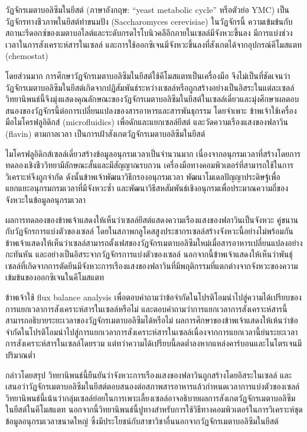 \documentclass{article}
\begin{document}
วัฏจักรเมตาบอลิซึมในยีสต์ (ภาษาอังกฤษ: ``yeast metabolic cycle'' หรือตัวย่อ YMC) เป็นวัฏจักรทางชีวภาพในยีสต์ทำขนมปัง (Saccharomyces cerevisiae) ในวัฏจักรนี้ ความเข้มข้นกับสถานะรีดอกซ์ของเมตาบอไลต์และระดับกรดไรโบนิวคลีอีกภายในเซลล์มีจังหวะขึ้นลง มีการแบ่งช่วงเวลาในการสังเคราะห์สารในเซลล์ และการใช้ออกซิเจนมีจังหวะขึ้นลงที่สังเกตได้จากอุปกรณ์คีโมสแตท (chemostat)

โดยส่วนมาก การศึกษาวัฏจักรเมตาบอลิซึมในยีสต์ใช้คีโมสแตทเป็นเครื่องมือ จึงไม่เป็นที่ชัดเจนว่าวัฏจักรเมตาบอลิซึมในยีสต์เกิดจากปฏิสัมพันธ์ระหว่างเซลล์หรือถูกสร้างอย่างเป็นอิสระในแต่ละเซลล์ วิทยานิพนธ์นี้จึงมุ่งแสดงคุณลักษณะของวัฏจักรเมตาบอลิซึมในยีสต์ในเซลล์เดี่ยวและมุ่งศึกษาผลตอบสนองของวัฏจักรนี้ต่อการเปลี่ยนแปลงของสารอาหารและสารพันธุกรรม โดยจำเพาะ ข้าพเจ้าใช้เครื่องมือไมโครฟลูอิดิกส์ (microfluidics) เพื่อดักและแยกเซลล์ยีสต์ และวัดความเรืองแสงของฟลาวิน (flavin) ตามกาลเวลา เป็นการเฝ้าสังเกตวัฏจักรเมตาบอลิซึมในยีสต์

ไมโครฟลูอิดิกส์เซลล์เดี่ยวสร้างข้อมูลอนุกรมเวลาเป็นจำนวนมาก เนื่องจากอนุกรมเวลาที่สร้างโดยการทดลองเชิงชีววิทยามีลักษณะสั้นและมีสัญญาณรบกวน เครื่องมือทางคอมพิวเตอร์ที่สามารถใช้ในการวิเคราะห์จึงถูกจำกัด ดังนั้นข้าพเจ้าพัฒนาวิธีกรองอนุกรมเวลา พัฒนาโมเดลปัญญาประดิษฐ์เพื่อแยกแยะอนุกรมกรมเวลาที่มีจังหวะซ้ำ และพัฒนาวิธีสหสัมพันธ์เชิงอนุกรมเพื่อประมาณความถี่ของจังหวะในข้อมูลอนุกรมเวลา

ผลการทดลองของข้าพเจ้าแสดงให้เห็นว่าเซลล์ยีสต์แสดงความเรืองแสงของฟลาวินเป็นจังหวะ คู่ขนานกับวัฏจักรการแบ่งตัวของเซลล์ โดยในสภาพกลูโคสสูงประชากรเซลล์สร้างจังหวะนี้อย่างไม่พร้อมกัน ข้าพเจ้าแสดงให้เห็นว่าเซลล์สามารถตั้งเฟสของวัฏจักรเมตาบอลิซึมใหม่เมื่อสารอาหารเปลี่ยนแปลงอย่างกะทันหัน และอย่างเป็นอิสระจากวัฏจักรการแบ่งตัวของเซลล์ นอกจากนี้ข้าพเจ้าแสดงให้เห็นว่าพันธุ์เซลล์ที่เกิดจากการตัดยีนมีจังหวะการเรืองแสงของฟลาวินที่มีพฤติกรรมที่แตกต่างจากจังหวะของความเข้มข้นของออกซิเจนในคีโมสแตท

ข้าพเจ้าใช้ flux balance analysis เพื่อตอบคำถามว่าข้อจำกัดในโปรติโอมนำไปสู่ความได้เปรียบของการแยกเวลาการสังเคราะห์สารในเซลล์หรือไม่ และตอบคำถามว่าการแยกเวลาการสังเคราะห์สารนี้สามารถอธิบายระยะเวลาของวัฏจักรเมตาบอลิซึมได้หรือไม่ ผลการศึกษาของข้าพเจ้าแสดงให้เห้นว่าข้อจำกัดในโปรติโอมนำไปสู่การแยกเวลาการสังเคราะห์สารในเซลล์เนื่องจากการแยกเวลานี้ย่นระยะเวลาการสังเคราะห์สารในเซลล์โดยรวม แต่ทว่าความได้เปรียบนี้ลดต่ำลงหากแหล่งคาร์บอนและไนโตรเจนมีปริมาณต่ำ

กล่าวโดยสรุป วิทยานิพนธ์นี้ยืนยันว่าจังหวะการเรืองแสงของฟลาวินถูกสร้างโดยอิสระในเซลล์ และเสนอว่าวัฏจักรเมตาบอลิซึมในยีสต์ตอบสนองต่อสภาพสารอาหารแล้วกำหนดเวลาการแบ่งตัวของเซลล์ วิทยานิพนธ์นี้เน้นว่ากลุ่มเซลล์ย่อยในการเพาะเลี้ยงเซลล์อาจอธิบายผลการสังเกตวัฏจักรเมตาบอลิซึมในยีสต์ในคีโมสแตท นอกจากนี้วิทยานิพนธ์นี้ปูทางสำหรับการใช้วิธีทางคอมพิวเตอร์ในการวิเคราะห์ชุดข้อมูลอนุกรมเวลาขนาดใหญ่ ซึ่งมีประโยชน์กับสาขาวิชาอื่นนอกจากวัฏจักรเมตาบอลิซึมในยีสต์
\end{document}
